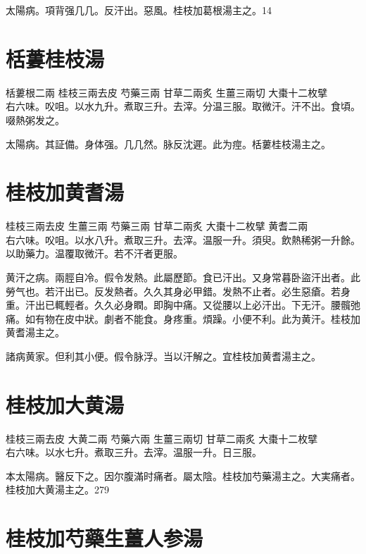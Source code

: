 太陽病。項背强几几。反汗出。惡風。桂枝{\khaaitp 加葛根}湯主之。14

\section{栝蔞桂枝湯}

栝蔞根{\scriptsize 二兩} 桂枝{\scriptsize 三兩去皮} 芍藥{\scriptsize 三兩} 甘草{\scriptsize 二兩炙} 生薑{\scriptsize 三兩切} 大棗{\scriptsize 十二枚擘}\\
右六味。㕮咀。以水九升。煮取三升。去滓。分温三服。取微汗。汗不出。食頃。啜熱粥发之。

太陽病。其証備。身体强。几几然。脉反沈遲。此为痙。栝蔞桂枝湯主之。

\section{桂枝加黄耆湯}

桂枝{\scriptsize 三兩去皮} 生薑{\scriptsize 三兩} 芍藥{\scriptsize 三兩} 甘草{\scriptsize 二兩炙} 大棗{\scriptsize 十二枚擘} 黄耆{\scriptsize 二兩}\\
右六味。㕮咀。以水八升。煮取三升。去滓。温服一升。須臾。飲熱稀粥一升餘。以助藥力。温覆取微汗。若不汗者更服。

黄汗之病。兩脛自冷。假令发熱。此屬歷節。食已汗出。又身常暮{\khaaitp 卧}盜汗出者。此勞气也。若汗出已。反发熱者。久久其身必甲錯。发熱不止者。必生惡瘡。若身重。汗出已輒輕者。久久必身瞤。即胸中痛。又從腰以上必汗出。下无汗。腰髖弛痛。如有物在皮中狀。劇者不能食。身疼重。煩躁。小便不利。此为黄汗。桂枝加黄耆湯主之。

諸病黄家。但利其小便。假令脉浮。当以汗解之。宜桂枝加黄耆湯主之。

\section{桂枝加大黄湯}

桂枝{\scriptsize 三兩去皮} 大黄{\scriptsize 二兩} 芍藥{\scriptsize 六兩} 生薑{\scriptsize 三兩切} 甘草{\scriptsize 二兩炙} 大棗{\scriptsize 十二枚擘}\\
右六味。以水七升。煮取三升。去滓。温服一升。日三服。

{\khaaitp 本}太陽病。醫反下之。因尔腹滿时痛者。屬太陰。桂枝加芍藥湯主之。大実痛者。桂枝加大黄湯主之。279

\section{桂枝加芍藥生薑人参湯}

